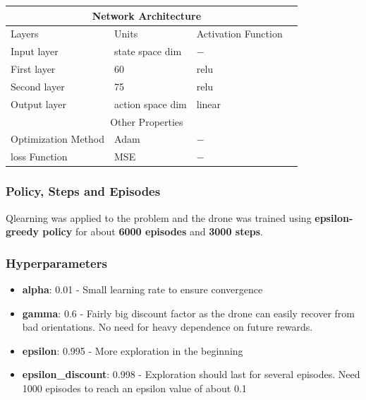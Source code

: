 \documentclass[12pt]{article}
\begin{document}
\begin{table}[h]
  \centering
\begin{tabular}{ |p{3cm}||p{3cm}|p{3cm}|p{3cm}|  }
 \hline
 \multicolumn{3}{|c|}{Network Architecture} \\
 \hline
 Layers     & Units & Activation Function \\
 \hline
 Input layer  & state space dim & $-$ \\
 First layer  & 60 & relu \\
 Second layer & 75 & relu \\
 Output layer & action space dim & linear \\
 \hline
 \multicolumn{3}{|c|}{Other Properties} \\
 \hline
 Optimization Method &Adam & $-$ \\
 \hline
 loss Function &MSE &$-$ \\
 \hline
\end{tabular}
\end{table}


\newpage
\subsubsection{Policy, Steps and Episodes}
Qlearning was applied to the problem and the drone was trained using \textbf{epsilon-greedy policy} for about \textbf{6000 episodes} and 
\textbf{3000 steps}.
\subsubsection{Hyperparameters}
\begin{itemize}
  \item \textbf{alpha}: 0.01 - Small learning rate to ensure convergence
  \item \textbf{gamma}: 0.6 - Fairly big discount factor as the drone can easily recover from bad orientations. 
    No need for heavy dependence on future rewards.
  \item \textbf{epsilon}: 0.995 - More exploration in the beginning  
  \item \textbf{epsilon\_discount}: 0.998  - Exploration should last for several episodes. Need 1000 episodes to reach an epsilon value 
    of about 0.1
\end{itemize}
\end{document}
